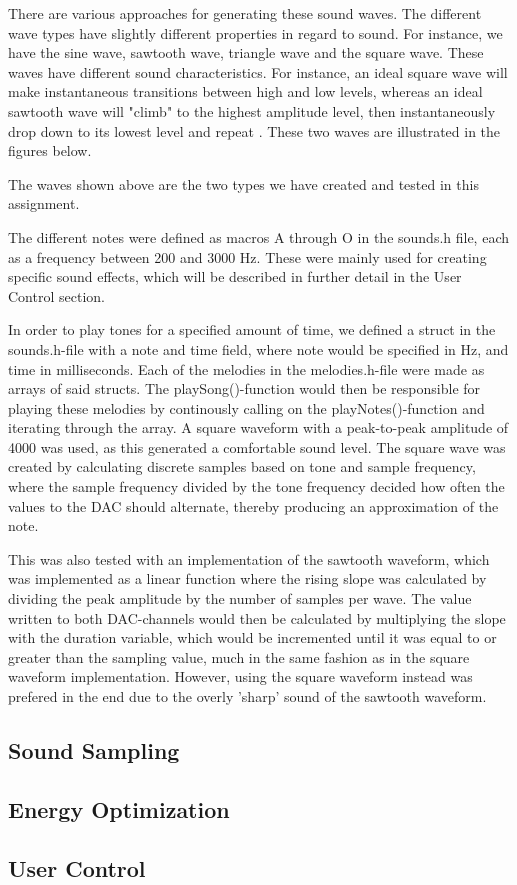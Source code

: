 There are various approaches for generating these sound waves. The different wave types have slightly different properties in regard to sound. For instance, we have the sine wave, sawtooth wave, triangle wave and the square wave. These waves have different sound characteristics. For instance, an ideal square wave will make instantaneous transitions between high and low levels, whereas an ideal sawtooth wave will "climb" to the highest amplitude level, then instantaneously drop down to its lowest level and repeat \cite{audioWaves}. These two waves are illustrated in the figures below.




The waves shown above are the two types we have created and tested in this assignment. 

The different notes were defined as macros A through O in the sounds.h file, each as a frequency between 200 and 3000 Hz. These were mainly used for creating specific sound effects, which will be described in further detail in the User Control section.
	
In order to play tones for a specified amount of time, we defined a struct in the sounds.h-file with a note and time field, where note would be specified in Hz, and time in milliseconds. Each of the melodies in the melodies.h-file were made as arrays of said structs. The playSong()-function would then be responsible for playing these melodies by continously calling on the playNotes()-function and iterating through the array. A square waveform with a peak-to-peak amplitude of 4000 was used, as this generated a comfortable sound level. The square wave was created by calculating discrete samples based on tone and sample frequency, where the sample frequency divided by the tone frequency decided how often the values to the DAC should alternate, thereby producing an approximation of the note. 

This was also tested with an implementation of the sawtooth waveform, which was implemented as a linear function where the rising slope was calculated by dividing the peak amplitude by the number of samples per wave. The value written to both DAC-channels would then be calculated by multiplying the slope with the duration variable, which would be incremented until it was equal to or greater than the sampling value, much in the same fashion as in the square waveform implementation. However, using the square waveform instead was prefered in the end due to the overly 'sharp' sound of the sawtooth waveform.

\subsection{Sound Sampling}



\subsection{Energy Optimization}




\subsection{User Control}
